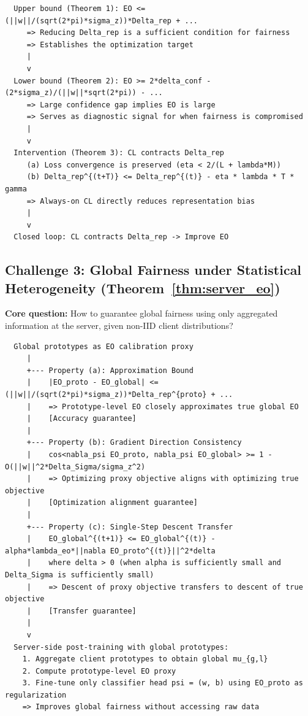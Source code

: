 \documentclass[11pt]{article}
\begin{document}
\begin{verbatim}
  Upper bound (Theorem 1): EO <= (||w||/(sqrt(2*pi)*sigma_z))*Delta_rep + ...
     => Reducing Delta_rep is a sufficient condition for fairness
     => Establishes the optimization target
     |
     v
  Lower bound (Theorem 2): EO >= 2*delta_conf - (2*sigma_z)/(||w||*sqrt(2*pi)) - ...
     => Large confidence gap implies EO is large
     => Serves as diagnostic signal for when fairness is compromised
     |
     v
  Intervention (Theorem 3): CL contracts Delta_rep
     (a) Loss convergence is preserved (eta < 2/(L + lambda*M))
     (b) Delta_rep^{(t+T)} <= Delta_rep^{(t)} - eta * lambda * T * gamma
     => Always-on CL directly reduces representation bias
     |
     v
  Closed loop: CL contracts Delta_rep -> Improve EO
\end{verbatim}

\subsection{Challenge 3: Global Fairness under Statistical Heterogeneity (Theorem~\ref{thm:server_eo})}

\textbf{Core question:} How to guarantee global fairness using only aggregated information at the server, given non-IID client distributions?

\begin{verbatim}
  Global prototypes as EO calibration proxy
     |
     +--- Property (a): Approximation Bound
     |    |EO_proto - EO_global| <= (||w||/(sqrt(2*pi)*sigma_z))*Delta_rep^{proto} + ...
     |    => Prototype-level EO closely approximates true global EO
     |    [Accuracy guarantee]
     |
     +--- Property (b): Gradient Direction Consistency
     |    cos<nabla_psi EO_proto, nabla_psi EO_global> >= 1 - O(||w||^2*Delta_Sigma/sigma_z^2)
     |    => Optimizing proxy objective aligns with optimizing true objective
     |    [Optimization alignment guarantee]
     |
     +--- Property (c): Single-Step Descent Transfer
     |    EO_global^{(t+1)} <= EO_global^{(t)} - alpha*lambda_eo*||nabla EO_proto^{(t)}||^2*delta
     |    where delta > 0 (when alpha is sufficiently small and Delta_Sigma is sufficiently small)
     |    => Descent of proxy objective transfers to descent of true objective
     |    [Transfer guarantee]
     |
     v
  Server-side post-training with global prototypes:
    1. Aggregate client prototypes to obtain global mu_{g,l}
    2. Compute prototype-level EO proxy
    3. Fine-tune only classifier head psi = (w, b) using EO_proto as regularization
    => Improves global fairness without accessing raw data
\end{verbatim}
\end{document}
